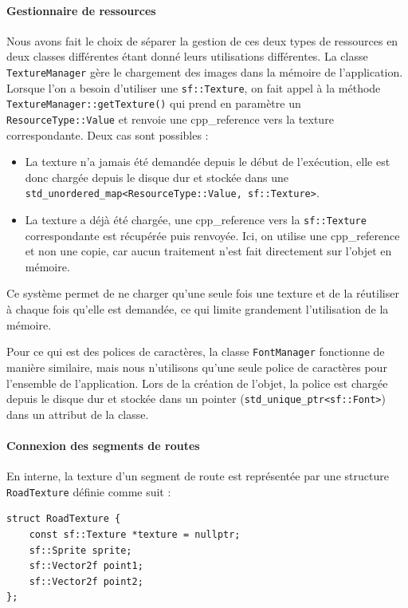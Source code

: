 \paragraph{Gestionnaire de ressources}
Nous avons fait le choix de séparer la gestion de ces deux types de ressources en deux classes différentes étant donné leurs utilisations différentes.
La classe \texttt{TextureManager} gère le chargement des images dans la mémoire de l'application.
Lorsque l'on a besoin d'utiliser une \texttt{sf::Texture}\cite{sfml_sf_texture}, on fait appel à la méthode \texttt{TextureManager::getTexture()} qui prend en paramètre un \texttt{ResourceType::Value} et renvoie une \gls{cpp_reference} vers la texture correspondante.
Deux cas sont possibles :
\begin{itemize}
    \item La texture n'a jamais été demandée depuis le début de l'exécution, elle est donc chargée depuis le disque dur et stockée dans une \texttt{\gls{std_unordered_map}<ResourceType::Value, sf::Texture>}\cite{cpp_reference_std_unordered_map}.
    \item La texture a déjà été chargée, une \gls{cpp_reference} vers la \texttt{sf::Texture}\cite{sfml_sf_texture} correspondante est récupérée puis renvoyée.
    Ici, on utilise une \gls{cpp_reference} et non une copie, car aucun traitement n'est fait directement sur l'objet en mémoire.
\end{itemize}
Ce système permet de ne charger qu'une seule fois une texture et de la réutiliser à chaque fois qu'elle est demandée, ce qui limite grandement l'utilisation de la mémoire.

Pour ce qui est des polices de caractères, la classe \texttt{FontManager} fonctionne de manière similaire, mais nous n'utilisons qu'une seule police de caractères pour l'ensemble de l'application.
Lors de la création de l'objet, la police est chargée depuis le disque dur et stockée dans un \gls{pointer} (\texttt{\gls{std_unique_ptr}<sf::Font>}\cite{cpp_reference_std_unique_ptr}) dans un attribut de la classe.

\paragraph{Connexion des segments de routes}
En interne, la texture d'un segment de route est représentée par une structure \texttt{RoadTexture} définie comme suit :

\begin{lstlisting}[style=CStyle,label={lst:struct_roadtexture}]
struct RoadTexture {
    const sf::Texture *texture = nullptr;
    sf::Sprite sprite;
    sf::Vector2f point1;
    sf::Vector2f point2;
};
\end{lstlisting}

